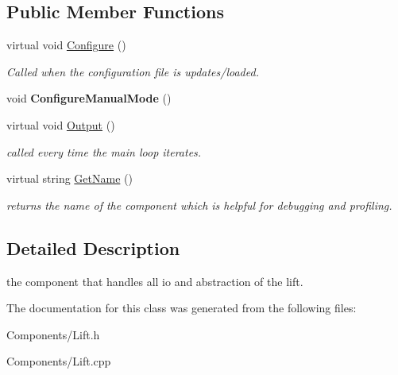 \subsection*{\-Public \-Member \-Functions}
\begin{DoxyCompactItemize}
\item 
\hypertarget{class_lift_a1d23cf42b381bb1eab60ed061f1ad8e6}{
virtual void \hyperlink{class_lift_a1d23cf42b381bb1eab60ed061f1ad8e6}{\-Configure} ()}
\label{class_lift_a1d23cf42b381bb1eab60ed061f1ad8e6}

\begin{DoxyCompactList}\small\item\em \-Called when the configuration file is updates/loaded. \end{DoxyCompactList}\item 
\hypertarget{class_lift_a70984975c8cbcdce79eade3bc6e92d8f}{
void {\bfseries \-Configure\-Manual\-Mode} ()}
\label{class_lift_a70984975c8cbcdce79eade3bc6e92d8f}

\item 
\hypertarget{class_lift_a290f03327cc1a9767226d15b977d2bd4}{
virtual void \hyperlink{class_lift_a290f03327cc1a9767226d15b977d2bd4}{\-Output} ()}
\label{class_lift_a290f03327cc1a9767226d15b977d2bd4}

\begin{DoxyCompactList}\small\item\em called every time the main loop iterates. \end{DoxyCompactList}\item 
\hypertarget{class_lift_ad53c2e6e4b2e9f70cdc8833d21191f96}{
virtual string \hyperlink{class_lift_ad53c2e6e4b2e9f70cdc8833d21191f96}{\-Get\-Name} ()}
\label{class_lift_ad53c2e6e4b2e9f70cdc8833d21191f96}

\begin{DoxyCompactList}\small\item\em returns the name of the component which is helpful for debugging and profiling. \end{DoxyCompactList}\end{DoxyCompactItemize}


\subsection{\-Detailed \-Description}
the component that handles all io and abstraction of the lift. 

\-The documentation for this class was generated from the following files\-:\begin{DoxyCompactItemize}
\item 
\-Components/\-Lift.\-h\item 
\-Components/\-Lift.\-cpp\end{DoxyCompactItemize}
